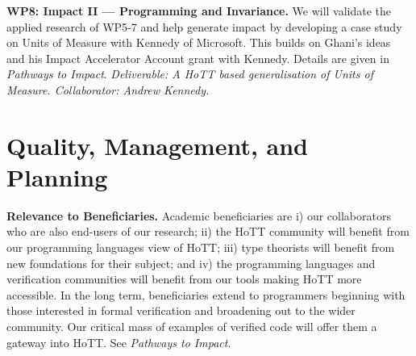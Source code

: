 \documentclass[a4paper,11pt]{article}
\begin{document}
{\bf WP8: Impact II --- Programming and Invariance.}  We will validate
the applied research of WP5-7 and help generate impact by developing a
case study on Units of Measure with Kennedy of Microsoft. This builds
on Ghani's ideas~\cite{uom} and his Impact Accelerator Account grant
with Kennedy. Details are given in {\em Pathways to Impact}. {\em
  Deliverable: A HoTT based generalisation of Units of
  Measure. Collaborator: Andrew Kennedy.  }


\vspace*{-0.2in}

\section{Quality, Management, and Planning}

\vspace*{-0.1in}

{\bf Relevance to Beneficiaries.} Academic beneficiaries
are i) our collaborators who are also end-users of our research; ii)
the HoTT community will benefit from our programming languages
view of HoTT; iii) type theorists will benefit from new
foundations for their subject; and iv) the programming languages and
verification communities will benefit from our tools making HoTT more
accessible. In the long term, beneficiaries extend to
programmers beginning with those interested in formal
verification and broadening out to the wider community. Our critical
mass of examples of verified code will offer them a gateway
into HoTT. See {\em Pathways to Impact}.
 
\end{document}
